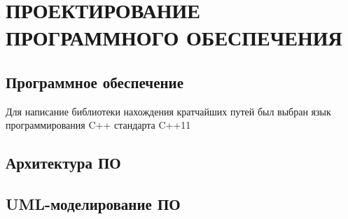 \section{\MakeTextUppercase{ПРОЕКТИРОВАНИЕ ПРОГРАММНОГО ОБЕСПЕЧЕНИЯ}}
\subsection{Программное обеспечение}

Для написание библиотеки нахождения кратчайших путей был выбран язык программирования C++ стандарта C++11  

\subsection{Архитектура ПО}
\subsection{UML-моделирование ПО}

